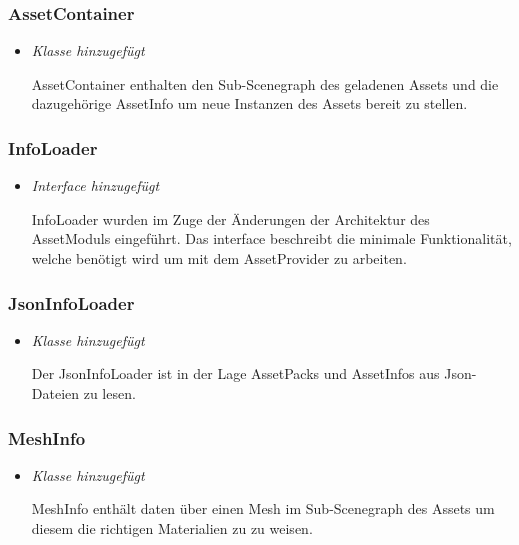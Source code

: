 \subsubsection{AssetContainer}
\begin{itemize}
    \item \textit{Klasse hinzugefügt}
        \begin{leftbar}[0.9\linewidth]
            AssetContainer enthalten den Sub-Scenegraph des geladenen Assets und die dazugehörige AssetInfo
            um neue Instanzen des Assets bereit zu stellen.
        \end{leftbar}
\end{itemize}

\pagebreak

\subsubsection{InfoLoader}
\begin{itemize}
    \item \textit{Interface hinzugefügt}
        \begin{leftbar}[0.9\linewidth]
            InfoLoader wurden im Zuge der Änderungen der Architektur des AssetModuls eingeführt.
            Das interface beschreibt die minimale Funktionalität, welche benötigt wird um mit dem
            AssetProvider zu arbeiten.
        \end{leftbar}
\end{itemize}

\subsubsection{JsonInfoLoader}
\begin{itemize}
    \item \textit{Klasse hinzugefügt}
        \begin{leftbar}[0.9\linewidth]
            Der JsonInfoLoader ist in der Lage AssetPacks und AssetInfos aus Json-Dateien zu lesen.
        \end{leftbar}
\end{itemize}

\subsubsection{MeshInfo}
\begin{itemize}
    \item \textit{Klasse hinzugefügt}
        \begin{leftbar}[0.9\linewidth]
            MeshInfo enthält daten über einen Mesh im Sub-Scenegraph des Assets um diesem die richtigen
            Materialien zu zu weisen.
        \end{leftbar}
\end{itemize}

